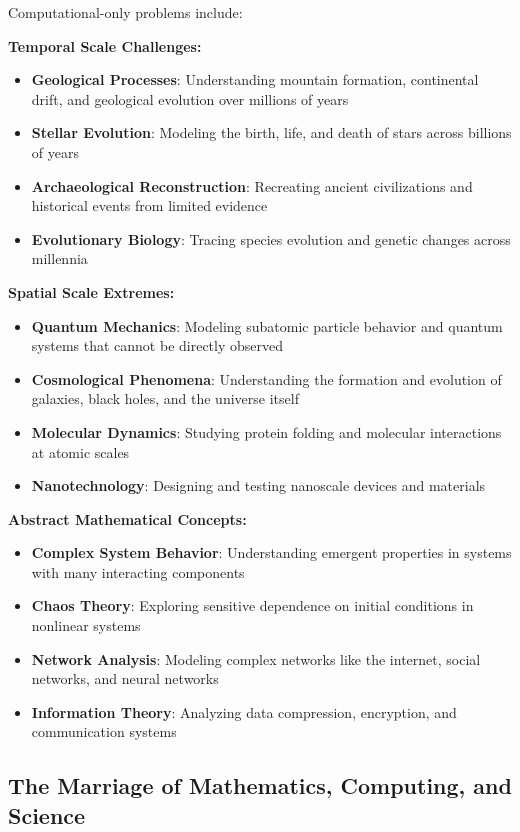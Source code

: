 Computational-only problems include:

\textbf{Temporal Scale Challenges:}
\begin{itemize}
    \item \textbf{Geological Processes}: Understanding mountain formation, continental drift, and geological evolution over millions of years
    \item \textbf{Stellar Evolution}: Modeling the birth, life, and death of stars across billions of years
    \item \textbf{Archaeological Reconstruction}: Recreating ancient civilizations and historical events from limited evidence
    \item \textbf{Evolutionary Biology}: Tracing species evolution and genetic changes across millennia
\end{itemize}

\textbf{Spatial Scale Extremes:}
\begin{itemize}
    \item \textbf{Quantum Mechanics}: Modeling subatomic particle behavior and quantum systems that cannot be directly observed
    \item \textbf{Cosmological Phenomena}: Understanding the formation and evolution of galaxies, black holes, and the universe itself
    \item \textbf{Molecular Dynamics}: Studying protein folding and molecular interactions at atomic scales
    \item \textbf{Nanotechnology}: Designing and testing nanoscale devices and materials
\end{itemize}

\textbf{Abstract Mathematical Concepts:}
\begin{itemize}
    \item \textbf{Complex System Behavior}: Understanding emergent properties in systems with many interacting components
    \item \textbf{Chaos Theory}: Exploring sensitive dependence on initial conditions in nonlinear systems
    \item \textbf{Network Analysis}: Modeling complex networks like the internet, social networks, and neural networks
    \item \textbf{Information Theory}: Analyzing data compression, encryption, and communication systems
\end{itemize}

\subsection{The Marriage of Mathematics, Computing, and Science}

